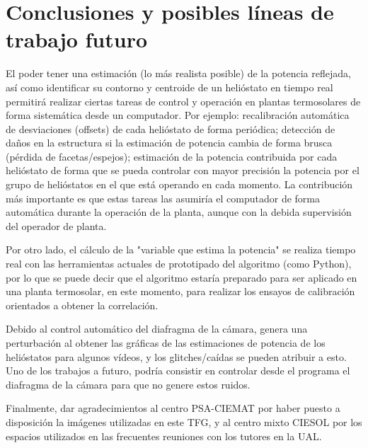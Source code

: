 \chapter{Conclusiones y posibles líneas de trabajo futuro}
 
El poder tener una estimación (lo más realista posible) de la potencia reflejada, así como identificar su contorno y centroide de un helióstato en tiempo real permitirá realizar ciertas tareas de control y operación en plantas termosolares de forma sistemática desde un computador. Por ejemplo: recalibración automática de desviaciones (offsets) de cada helióstato de forma periódica; detección de daños en la estructura si la estimación de potencia cambia de forma brusca (pérdida de facetas/espejos); estimación de la potencia contribuida por cada helióstato de forma que se pueda controlar con mayor precisión la potencia por el grupo de helióstatos en el que está operando en cada momento. La contribución más importante es que estas tareas las asumiría el computador de forma automática durante la operación de la planta, aunque con la debida supervisión del operador de planta.

Por otro lado, el cálculo de la "variable que estima la potencia" se realiza tiempo real con las herramientas actuales de prototipado del algoritmo (como Python), por lo que se puede decir que el algoritmo estaría preparado para ser aplicado en una planta termosolar, en este momento, para realizar los ensayos de calibración orientados a obtener la correlación.

Debido al control automático del diafragma de la cámara, genera una perturbación al obtener las gráficas de las estimaciones de potencia de los helióstatos para algunos vídeos, y los glitches/caídas se pueden atribuir a esto. Uno de los trabajos a futuro, podría consistir en controlar desde el programa el diafragma de la cámara para que no genere estos ruidos.

Finalmente, dar agradecimientos al centro PSA-CIEMAT por haber puesto a disposición la imágenes utilizadas en este TFG, y al centro mixto CIESOL por los espacios utilizados en las frecuentes reuniones con los tutores en la UAL.